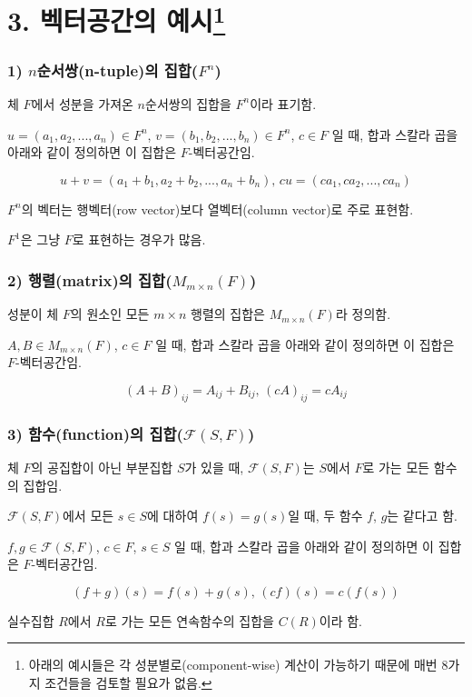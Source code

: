 \section*{3. 벡터공간의 예시\footnote{아래의 예시들은 각 성분별로(component-wise) 계산이 가능하기 때문에 매번 8가지 조건들을 검토할 필요가 없음.}}
\subsubsection*{1) $n$순서쌍(n-tuple)의 집합($F^n$)}
체 $F$에서 성분을 가져온 $n$순서쌍의 집합을 $F^n$이라 표기함.

$u=(a_1,a_2, ... ,a_n) \in F^n$, $v=(b_1,b_2, ... ,b_n) \in F^n$, $c \in F$ 일 때, 합과 스칼라 곱을 아래와 같이 정의하면 이 집합은 $F$-벡터공간임.

\[u+v=(a_1+b_1,a_2+b_2, ... ,a_n+b_n),\,cu=(ca_1,ca_2, ... ,ca_n)\]

$F^n$의 벡터는 행벡터(row vector)보다 열벡터(column vector)로 주로 표현함.

$F^1$은 그냥 $F$로 표현하는 경우가 많음.


\subsubsection*{2) 행렬(matrix)의 집합($M_{m \times n}(F)$)}
성분이 체 $F$의 원소인 모든 $m \times n$ 행렬의 집합은 $M_{m \times n}(F)$라 정의함.

$A,B \in M_{m \times n}(F)$, $c \in F$ 일 때, 합과 스칼라 곱을 아래와 같이 정의하면 이 집합은 $F$-벡터공간임.

\[(A+B)_{ij}=A_{ij}+B_{ij},\,(cA)_{ij}=cA_{ij}\]


\subsubsection*{3) 함수(function)의 집합($\mathcal{F}(S,F)$)}
체 $F$의 공집합이 아닌 부분집합 $S$가 있을 때, $\mathcal{F}(S,F)$는 $S$에서 $F$로 가는 모든 함수의 집합임.

$\mathcal{F}(S,F)$에서 모든 $s \in S$에 대하여 $f(s)=g(s)$일 때, 두 함수 $f$, $g$는 같다고 함.

$f,g \in \mathcal{F}(S,F)$, $c \in F$, $s \in S$ 일 때, 합과 스칼라 곱을 아래와 같이 정의하면 이 집합은 $F$-벡터공간임.

\[(f+g)(s)=f(s)+g(s),\,(cf)(s)=c(f(s))\]

실수집합 $R$에서 $R$로 가는 모든 연속함수의 집합을 $C(R)$이라 함.\\



